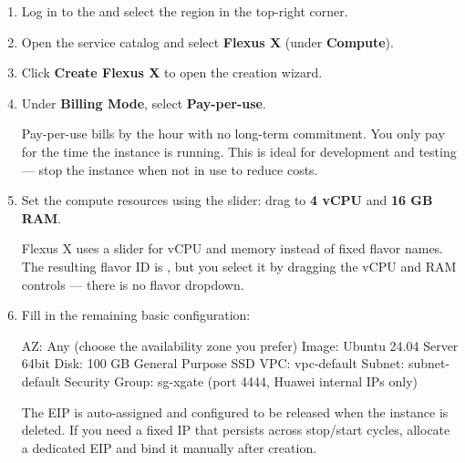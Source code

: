 \documentclass{guide}
\begin{document}
\stepbystep
\begin{enumerate}
  \item Log in to the  and select the  region in the top-right
        corner.

  \item Open the service catalog and select \textbf{Flexus X}
        (under \textbf{Compute}).

  \item Click \textbf{Create Flexus X} to open the creation wizard.

  \item Under \textbf{Billing Mode}, select \textbf{Pay-per-use}.

  \begin{tip}
  Pay-per-use bills by the hour with no long-term commitment. You only pay
  for the time the instance is running. This is ideal for development and
  testing --- stop the instance when not in use to reduce costs.
  \end{tip}

  \item Set the compute resources using the slider:
        drag to \textbf{4 vCPU} and \textbf{16 GB RAM}.

  \begin{infobox}
  Flexus X uses a slider for vCPU and memory instead of fixed flavor names.
  The resulting flavor ID is , but you select it by
  dragging the vCPU and RAM controls --- there is no flavor dropdown.
  \end{infobox}

  \item Fill in the remaining basic configuration:

  \begin{code}
AZ:             Any (choose the availability zone you prefer)
Image:          Ubuntu 24.04 Server 64bit
Disk:           100 GB General Purpose SSD
VPC:            vpc-default
Subnet:         subnet-default
Security Group: sg-xgate (port 4444, Huawei internal IPs only)
  \end{code}

  \begin{warning}
  The EIP is auto-assigned and configured to be released when the instance is
  deleted. If you need a fixed IP that persists across stop/start cycles,
  allocate a dedicated EIP and bind it manually after creation.
  \end{warning}


\end{enumerate}
\end{document}
